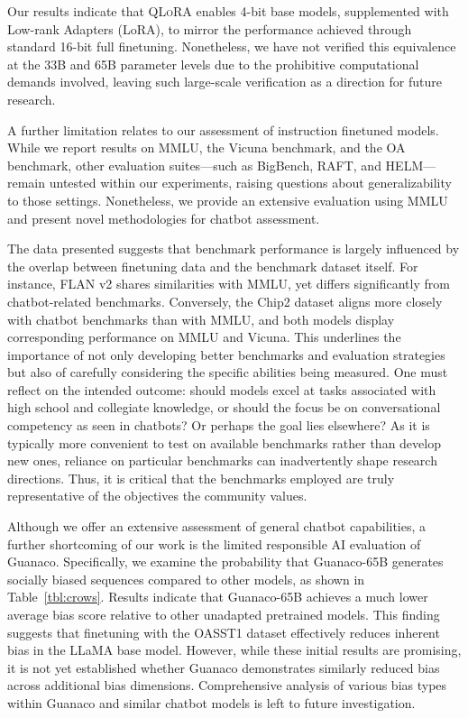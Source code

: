Our results indicate that \textsc{QLoRA} enables 4-bit base models, supplemented with Low-rank Adapters (LoRA), to mirror the performance achieved through standard 16-bit full finetuning. Nonetheless, we have not verified this equivalence at the 33B and 65B parameter levels due to the prohibitive computational demands involved, leaving such large-scale verification as a direction for future research.

A further limitation relates to our assessment of instruction finetuned models. While we report results on MMLU, the Vicuna benchmark, and the OA benchmark, other evaluation suites—such as BigBench, RAFT, and HELM—remain untested within our experiments, raising questions about generalizability to those settings. Nonetheless, we provide an extensive evaluation using MMLU and present novel methodologies for chatbot assessment.

The data presented suggests that benchmark performance is largely influenced by the overlap between finetuning data and the benchmark dataset itself. For instance, FLAN v2 shares similarities with MMLU, yet differs significantly from chatbot-related benchmarks. Conversely, the Chip2 dataset aligns more closely with chatbot benchmarks than with MMLU, and both models display corresponding performance on MMLU and Vicuna. This underlines the importance of not only developing better benchmarks and evaluation strategies but also of carefully considering the specific abilities being measured. One must reflect on the intended outcome: should models excel at tasks associated with high school and collegiate knowledge, or should the focus be on conversational competency as seen in chatbots? Or perhaps the goal lies elsewhere? As it is typically more convenient to test on available benchmarks rather than develop new ones, reliance on particular benchmarks can inadvertently shape research directions. Thus, it is critical that the benchmarks employed are truly representative of the objectives the community values.

Although we offer an extensive assessment of general chatbot capabilities, a further shortcoming of our work is the limited responsible AI evaluation of {Guanaco}. Specifically, we examine the probability that {Guanaco}-65B generates socially biased sequences compared to other models, as shown in Table~\ref{tbl:crows}. Results indicate that {Guanaco}-65B achieves a much lower average bias score relative to other unadapted pretrained models. This finding suggests that finetuning with the OASST1 dataset effectively reduces inherent bias in the LLaMA base model. However, while these initial results are promising, it is not yet established whether {Guanaco} demonstrates similarly reduced bias across additional bias dimensions. Comprehensive analysis of various bias types within {Guanaco} and similar chatbot models is left to future investigation.

